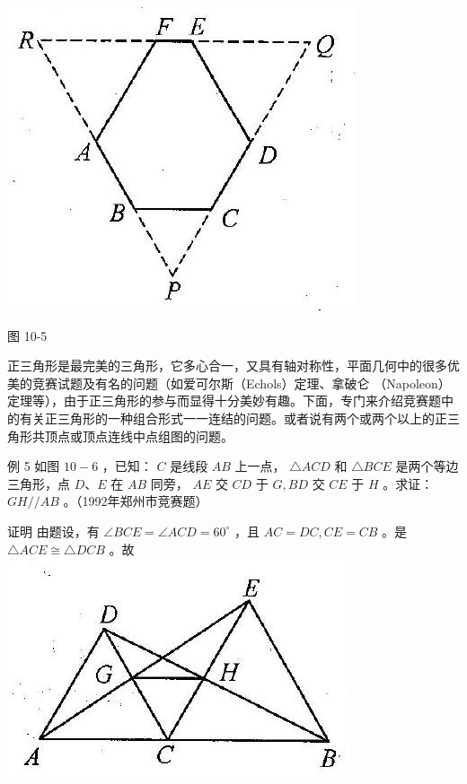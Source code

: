 \documentclass[10pt]{article}
\begin{document}
\begin{center}
\includegraphics[max width=\textwidth]{2024_10_30_2c8f45efd4a519b08e1ag-097(1)}
\end{center}

图 10-5

正三角形是最完美的三角形，它多心合一，又具有轴对称性，平面几何中的很多优美的竞赛试题及有名的问题（如爱可尔斯（Echols）定理、拿破仑 （Napoleon）定理等），由于正三角形的参与而显得十分美妙有趣。下面，专门来介绍竞赛题中的有关正三角形的一种组合形式一一连结的问题。或者说有两个或两个以上的正三角形共顶点或顶点连线中点组图的问题。

例 5 如图 $10-6$ ，已知： $C$ 是线段 $A B$ 上一点， $\triangle A C D$ 和 $\triangle B C E$ 是两个等边三角形，点 $D 、 E$ 在 $A B$ 同旁， $A E$ 交 $C D$ 于 $G, B D$ 交 $C E$ 于 $H$ 。求证： $G H / / A B$ 。（1992年郑州市竞赛题）

证明 由题设，有 $\angle B C E=\angle A C D=60^{\circ}$ ，且 $A C=D C, C E=C B$ 。是 $\triangle A C E \cong \triangle D C B$ 。故\\
\includegraphics[max width=\textwidth, center]{2024_10_30_2c8f45efd4a519b08e1ag-097}
\end{document}
